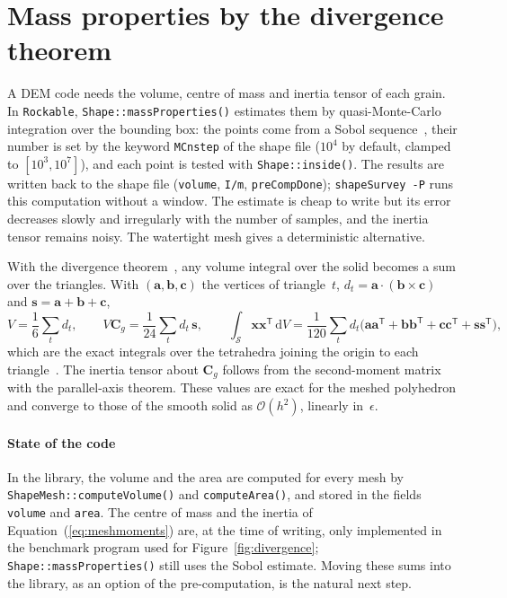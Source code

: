 \documentclass[11pt,a4paper]{article}
\newcommand{\shape}{\mathcal{S}}       %
\newcommand{\vect}[1]{\mathbf{#1}}
\newcommand{\sag}{\epsilon}
\newcommand{\code}[1]{\texttt{#1}}
\begin{document}
\section{Mass properties by the divergence theorem}
\label{sec:mass}

A DEM code needs the volume, centre of mass and inertia tensor of each grain. In
\code{Rockable}, \code{Shape::massProperties()} estimates them by quasi-Monte-Carlo
integration over the bounding box: the points come from a Sobol
sequence~\cite{sobol1967,niederreiter1992}, their number is set by the keyword
\code{MCnstep} of the shape file ($10^4$ by default, clamped to
$[10^3,10^7]$), and each point is tested with \code{Shape::inside()}. The results
are written back to the shape file (\code{volume}, \code{I/m}, \code{preCompDone});
\code{shapeSurvey -P} runs this computation without a window. The estimate is
cheap to write but its error decreases slowly and irregularly with the number of
samples, and the inertia tensor remains noisy. The watertight mesh gives a
deterministic alternative.

With the divergence theorem~\cite{lien1984,mirtich1996}, any volume integral over
the solid becomes a sum over the triangles. With $(\vect{a},\vect{b},\vect{c})$ the
vertices of triangle~$t$, $d_t=\vect{a}\cdot(\vect{b}\times\vect{c})$ and
$\vect{s}=\vect{a}+\vect{b}+\vect{c}$,
%
\begin{equation}
  V = \frac{1}{6}\sum_{t} d_t,
  \qquad
  V\vect{C}_g = \frac{1}{24}\sum_{t} d_t\,\vect{s},
  \qquad
  \int_{\shape}\!\vect{x} \vect{x}^{\mathsf{T}}\,\mathrm{d}V
    = \frac{1}{120}\sum_{t} d_t\big(\vect{a}\vect{a}^{\mathsf{T}}
      +\vect{b}\vect{b}^{\mathsf{T}}+\vect{c}\vect{c}^{\mathsf{T}}
      +\vect{s}\vect{s}^{\mathsf{T}}\big),
  \label{eq:meshmoments}
\end{equation}
%
which are the exact integrals over the tetrahedra joining the origin to each
triangle~\cite{tonon2005,kallay2006}. The inertia tensor about $\vect{C}_g$ follows
from the second-moment matrix with the parallel-axis theorem. These values are
exact for the meshed polyhedron and converge to those of the smooth solid as
$\mathcal{O}(h^2)$, linearly in~$\sag$.

\paragraph{State of the code} In the library, the volume and the area are
computed for every mesh by \code{ShapeMesh::computeVolume()} and
\code{computeArea()}, and stored in the fields \code{volume} and \code{area}. The
centre of mass and the inertia of Equation~(\ref{eq:meshmoments}) are, at the time
of writing, only implemented in the benchmark program used for
Figure~\ref{fig:divergence}; \code{Shape::massProperties()} still uses the Sobol
estimate. Moving these sums into the library, as an option of the pre-computation,
is the natural next step.
\end{document}
